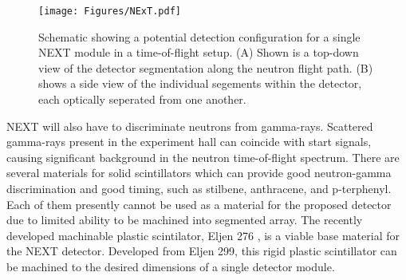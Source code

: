 \documentclass[preprint,3p,twocolumn]{elsarticle}
\begin{document}
\begin{figure}[tp]
  \centering
  \texttt{[image: Figures/NExT.pdf]}
  \caption{Schematic showing a potential detection configuration for a single NEXT module in a time-of-flight setup. (A) Shown is a top-down view of the detector segmentation along the neutron flight path. (B) shows a side view of the individual segements within the detector, each optically seperated from one another.}
  \label{fig:NEXTschematic}
\end{figure}
NEXT will also have to discriminate neutrons from gamma-rays. Scattered gamma-rays present in the experiment hall can coincide with start signals, causing significant background in the neutron time-of-flight spectrum.
There are several materials for solid scintillators which can provide good neutron-gamma discrimination and good timing, such as stilbene, anthracene, and p-terphenyl. Each of them presently cannot be used as a material for the proposed detector due to limited ability to be machined into segmented array. The recently developed machinable plastic scintilator, Eljen 276 \cite{ZAITSEVA201897}, is a viable base material for the NEXT detector. Developed from Eljen 299, this rigid plastic scintillator can be machined to the desired dimensions of a single detector module. 
\end{document}
